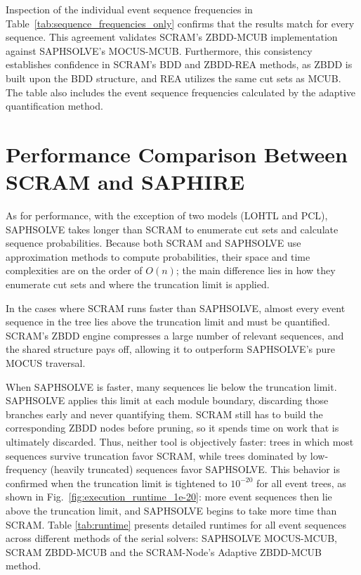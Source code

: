 Inspection of the individual event sequence frequencies in Table~\ref{tab:sequence_frequencies_only} confirms that the results match for every sequence. This agreement validates SCRAM's ZBDD-MCUB implementation against SAPHSOLVE's MOCUS-MCUB. Furthermore, this consistency establishes confidence in SCRAM's BDD and ZBDD-REA methods, as ZBDD is built upon the BDD structure, and REA utilizes the same cut sets as MCUB. The table also includes the event sequence frequencies calculated by the adaptive quantification method.



\section{Performance Comparison Between SCRAM and SAPHIRE}

As for performance, with the exception of two models (LOHTL and PCL), SAPHSOLVE takes longer than SCRAM to enumerate cut sets and calculate sequence probabilities. Because both SCRAM and SAPHSOLVE use approximation methods to compute probabilities, their space and time complexities are on the order of \(O(n)\); the main difference lies in how they enumerate cut sets and where the truncation limit is applied.

In the cases where SCRAM runs faster than SAPHSOLVE, almost every event sequence in the tree lies above the truncation limit and must be quantified. SCRAM’s ZBDD engine compresses a large number of relevant sequences, and the shared structure pays off, allowing it to outperform SAPHSOLVE’s pure MOCUS traversal.





When SAPHSOLVE is faster, many sequences lie below the truncation limit. SAPHSOLVE applies this limit at each module boundary, discarding those branches early and never quantifying them. SCRAM still has to build the corresponding ZBDD nodes before pruning, so it spends time on work that is ultimately discarded. Thus, neither tool is objectively faster: trees in which most sequences survive truncation favor SCRAM, while trees dominated by low-frequency (heavily truncated) sequences favor SAPHSOLVE. This behavior is confirmed when the truncation limit is tightened to \(10^{-20}\) for all event trees, as shown in Fig.~\ref{fig:execution_runtime_1e-20}: more event sequences then lie above the truncation limit, and SAPHSOLVE begins to take more time than SCRAM. Table \ref{tab:runtime} presents detailed runtimes for all event sequences across different methods of the serial solvers: SAPHSOLVE MOCUS-MCUB, SCRAM ZBDD-MCUB and the SCRAM-Node's Adaptive ZBDD-MCUB method.

